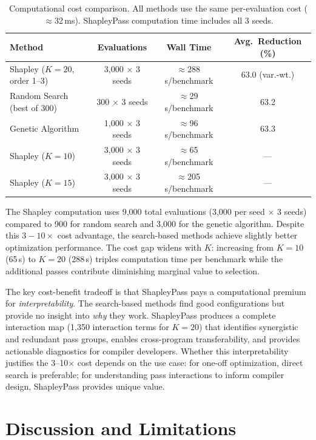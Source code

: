 \documentclass[preprint]{article}
\begin{document}
\begin{table}[t]
\caption{Computational cost comparison. All methods use the same per-evaluation cost ($\approx$32\,ms). ShapleyPass computation time includes all 3 seeds.}
\label{tab:cost}
\centering
\small
\begin{tabular}{lccc}
\toprule
Method & Evaluations & Wall Time & Avg.\ Reduction (\%) \\
\midrule
Shapley ($K{=}20$, order 1--3) & 3{,}000 $\times$ 3 seeds & $\approx$288\,s/benchmark & 63.0 (var.-wt.) \\
Random Search (best of 300) & 300 $\times$ 3 seeds & $\approx$29\,s/benchmark & 63.2 \\
Genetic Algorithm & 1{,}000 $\times$ 3 seeds & $\approx$96\,s/benchmark & 63.3 \\
\midrule
Shapley ($K{=}10$) & 3{,}000 $\times$ 3 seeds & $\approx$65\,s/benchmark & --- \\
Shapley ($K{=}15$) & 3{,}000 $\times$ 3 seeds & $\approx$205\,s/benchmark & --- \\
\bottomrule
\end{tabular}
\end{table}

The Shapley computation uses 9{,}000 total evaluations (3{,}000 per seed $\times$ 3 seeds) compared to 900 for random search and 3{,}000 for the genetic algorithm. Despite this $3{-}10\times$ cost advantage, the search-based methods achieve slightly better optimization performance. The cost gap widens with $K$: increasing from $K{=}10$ (65\,s) to $K{=}20$ (288\,s) triples computation time per benchmark while the additional passes contribute diminishing marginal value to selection.

The key cost-benefit tradeoff is that ShapleyPass pays a computational premium for \emph{interpretability}. The search-based methods find good configurations but provide no insight into \emph{why} they work. ShapleyPass produces a complete interaction map (1{,}350 interaction terms for $K{=}20$) that identifies synergistic and redundant pass groups, enables cross-program transferability, and provides actionable diagnostics for compiler developers. Whether this interpretability justifies the 3--10$\times$ cost depends on the use case: for one-off optimization, direct search is preferable; for understanding pass interactions to inform compiler design, ShapleyPass provides unique value.

\section{Discussion and Limitations}
\label{sec:discussion}
\end{document}
